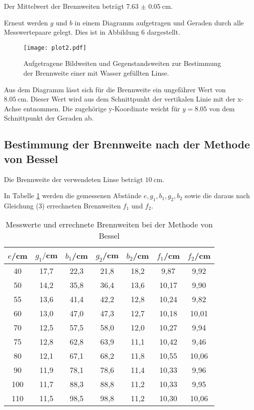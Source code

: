 Der Mittelwert der Brennweiten beträgt $\SI{7.63(5)}{\centi\meter}$.

Erneut werden $g$ und $b$ in einem Diagramm aufgetragen und Geraden durch alle Messwertepaare gelegt. Dies ist in Abbildung 6
dargestellt.

\begin{figure}[H]
  \centering
  \texttt{[image: plot2.pdf]}
  \caption{Aufgetragene Bildweiten und Gegenstandsweiten zur Bestimmung der Brennweite einer mit Wasser gefüllten Linse.}
  \label{fig:plot}
\end{figure}


Aus dem Diagramm lässt sich für die Brennweite ein ungefährer Wert von  $\SI{8.05}{\centi\meter}$. Dieser Wert wird aus
dem Schnittpunkt der vertikalen Linie mit der x-Achse entnommen. Die zugehörige y-Koordinate weicht für $y=8.05$ von dem
Schnittpunkt der Geraden ab.


\subsection{Bestimmung der Brennweite nach der Methode von Bessel}
Die Brennweite der verwendeten Linse beträgt $\SI{10}{\centi\meter}$.

In Tabelle \ref{tab:bessel} werden die gemessenen Abstände $e, g_1, b_1, g_2, b_2$ sowie die daraus nach Gleichung (3)
errechneten Brennweiten $f_1$ und $f_2$.
\begin{table}[H]
  \centering
  \caption{Messwerte und errechnete Brennweiten bei der Methode von Bessel}
  \label{tab:bessel}
  \begin{tabular}{c c c c c c c}
    \toprule
    $e$/cm  & $g_1/$cm & $b_1$/cm & $g_2$/cm & $b_2$/cm & $f_1$/cm & $f_2$/cm \\
    \midrule
    40  &   17,7  & 22,3  &  21,8 &   18,2 & 9,87  & 9,92 \\
    50   &  14,2  & 35,8   & 36,4  &  13,6 & 10,17 & 9,90 \\
    55   &  13,6  & 41,4   & 42,2  &  12,8 & 10,24 & 9,82 \\
    60  &   13,0  & 47,0   & 47,3  &  12,7 & 10,18 & 10,01 \\
    70  &   12,5 &  57,5  &  58,0  &  12,0 & 10,27 & 9,94 \\
    75  &   12,8 &  62,8  &  63,9  &  11,1 & 10,42 & 9,46 \\
    80  &   12,1 &  67,1  &  68,2  &  11,8 & 10,55 & 10,06 \\
    90  &   11,9 &  78,1  &  78,6  &  11,4 & 10,33 & 9,96 \\
    100  &  11,7 &  88,3  &  88,8  &  11,2 & 10,33 & 9,95 \\
    110  &  11,5 &  98,5  &  98,8  &  11,2 & 10,30 & 10,06  \\
    \bottomrule
  \end{tabular}
\end{table}

